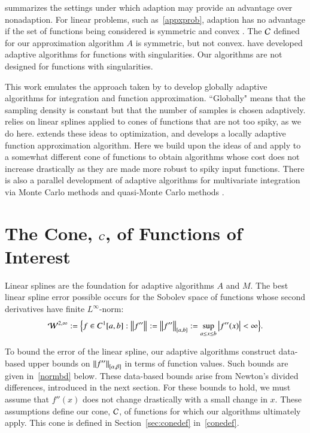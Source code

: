 \documentclass[review]{elsarticle}
\theoremstyle{definition}
\begin{document}
\cite{Nov96a} summarizes the settings under which adaption may provide an advantage over nonadaption.  For linear problems, such as~\eqref{appxprob}, adaption has no advantage if the set of functions being considered is symmetric and convex \cite[Chapter 4, Theorem 5.2.1]{TraWasWoz88} \cite[Theorem 1]{Nov96a}.  The $\cc$ defined for our approximation algorithm $A$ is symmetric, but not convex.  \cite{PlaEtal08a} have developed adaptive algorithms for functions with singularities.  Our algorithms are not designed for functions with singularities.

This work emulates the approach taken by \cite{HicEtal14b} to develop globally adaptive algorithms for integration and function approximation.  ``Globally" means that the sampling density is constant but that the number of samples is chosen adaptively.  \cite{HicEtal14b} relies on linear splines applied to cones of functions that are not too spiky, as we do here.  \cite{Ton14a} extends these ideas to optimization, and \cite{Din15a} develops a locally adaptive function approximation algorithm.  Here we build upon the ideas of \cite{Din15a} and apply to a somewhat different cone of functions to obtain algorithms whose cost does not increase drastically as they are made more robust to spiky input functions.  There is also a parallel development of adaptive algorithms for multivariate integration via Monte Carlo methods \citep{HicEtal14a, Jia16a} and quasi-Monte Carlo methods \citep{HicJim16a,JimHic16a}.

\section{The Cone, $\cc$, of Functions of Interest} \label{sec:cone}

Linear splines are the foundation for adaptive algorithms $A$ and $M$. The best linear spline error possible occurs for the Sobolev space of functions whose second derivatives have finite $L^{\infty}$-norm:
\[
\cw^{2,\infty} := \Bigl \{f \in C^1[a,b] : \norm{f''} : = \norm[{[a,b]}]{f''} : = \sup_{a \le x \le b} \abs{f''(x)} <  \infty \Bigr\}.
\]

To bound the error of the linear spline, our adaptive algorithms construct data-based upper bounds on $\norm[{[\alpha,
\beta]}]{f''}$ in terms of function values.  Such bounds are given in~\eqref{normbd} below.  These data-based bounds arise from Newton's divided differences, introduced in the next section.  For these bounds to hold, we must  assume that $f''(x)$ does not change drastically with a small change in $x$.  These assumptions define our cone, $\cc$, of functions for which our algorithms ultimately apply.  This cone is defined in Section~\ref{sec:conedef} in~\eqref{conedef}.
\end{document}
